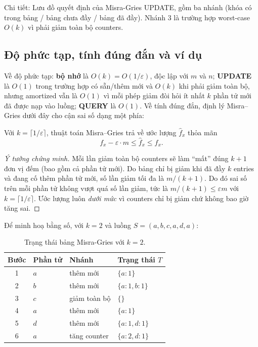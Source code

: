 \noindent Chi tiết: Lưu đồ quyết định của Misra-Gries UPDATE, gồm ba nhánh (khóa có trong bảng / bảng chưa đầy / bảng đã đầy). Nhánh 3 là trường hợp worst-case $O(k)$ vì phải giảm toàn bộ counters.

\subsection{Độ phức tạp, tính đúng đắn và ví dụ}

Về độ phức tạp: \textbf{bộ nhớ} là $O(k) = O(1/\varepsilon)$, độc lập với $m$ và $n$; \textbf{UPDATE} là $O(1)$ trong trường hợp có sẵn/thêm mới và $O(k)$ khi phải giảm toàn bộ, nhưng amortized vẫn là $O(1)$ vì mỗi phép giảm đòi hỏi ít nhất $k$ phần tử mới đã được nạp vào luồng; \textbf{QUERY} là $O(1)$. Về tính đúng đắn, định lý Misra--Gries dưới đây cho cận sai số dạng một phía:

\begin{theorem}
\label{thm:mg}
Với $k = \lceil 1/\varepsilon \rceil$, thuật toán Misra--Gries trả về ước lượng $\hat{f}_x$ thỏa mãn
\begin{equation}
f_x - \varepsilon \cdot m \le \hat{f}_x \le f_x.
\label{eq:misra-gries-guarantee}
\end{equation}
\end{theorem}

\begin{proof}[Ý tưởng chứng minh]
Mỗi lần giảm toàn bộ counters sẽ làm ``mất'' đúng $k + 1$ đơn vị đếm (bao gồm cả phần tử mới). Do bảng chỉ bị giảm khi đã đầy $k$ entries và đang cố thêm phần tử mới, số lần giảm tối đa là $m/(k+1)$. Do đó sai số trên mỗi phần tử không vượt quá số lần giảm, tức là $m/(k+1) \le \varepsilon m$ với $k = \lceil 1/\varepsilon \rceil$. Ước lượng luôn \textit{dưới mức} vì counters chỉ bị giảm chứ không bao giờ tăng sai.
\end{proof}

Để minh hoạ bằng số, với $k = 2$ và luồng $S = (a, b, c, a, d, a)$:

\begin{table}[H]
  \centering
  \caption{Trạng thái bảng Misra-Gries với $k = 2$.}
  \label{tab:mg-trace}
  \begin{tabular}{@{}c l l l@{}}
    \toprule
    \textbf{Bước} & \textbf{Phần tử} & \textbf{Nhánh} & \textbf{Trạng thái $T$} \\
    \midrule
    1 & $a$ & thêm mới & $\{a: 1\}$ \\
    2 & $b$ & thêm mới & $\{a: 1, b: 1\}$ \\
    3 & $c$ & giảm toàn bộ & $\{\}$ \\
    4 & $a$ & thêm mới & $\{a: 1\}$ \\
    5 & $d$ & thêm mới & $\{a: 1, d: 1\}$ \\
    6 & $a$ & tăng counter & $\{a: 2, d: 1\}$ \\
    \bottomrule
  \end{tabular}
\end{table}

